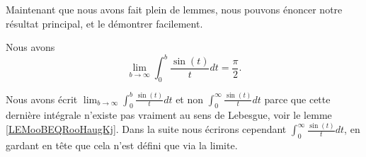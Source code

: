 Maintenant que nous avons fait plein de lemmes, nous pouvons énoncer notre résultat principal, et le démontrer facilement.

\begin{theorem}
    Nous avons
    \begin{equation}
        \lim_{b\to \infty} \int_0^b\frac{ \sin(t) }{ t }dt=\frac{ \pi }{2}.
    \end{equation}
\end{theorem}

Nous avons écrit \( \lim_{b\to \infty} \int_0^b\frac{ \sin(t) }{ t }dt\) et non \( \int_0^{\infty}\frac{ \sin(t) }{ t }dt\) parce que cette dernière intégrale n'existe pas vraiment au sens de Lebesgue, voir le lemme \ref{LEMooBEQRooHaugKj}. Dans la suite nous écrirons cependant \( \int_0^{\infty}\frac{ \sin(t) }{ t }dt\), en gardant en tête que cela n'est défini que via la limite.

